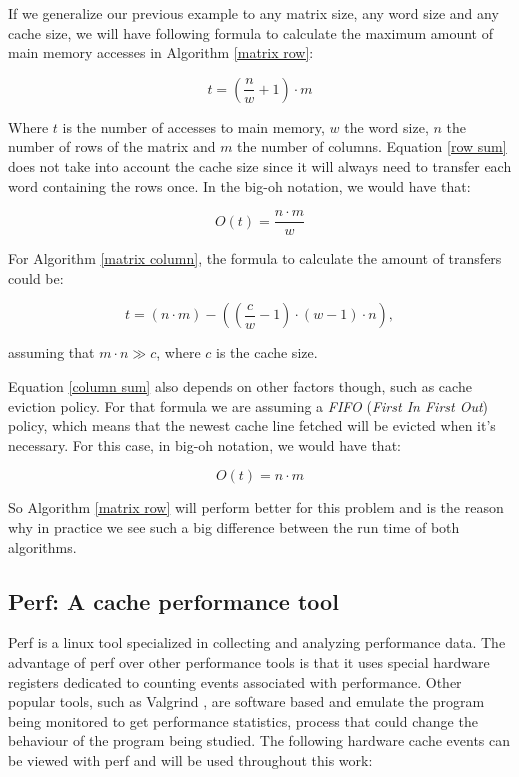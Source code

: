 \documentclass[12pt]{diicc}
\begin{document}
If we generalize our previous example to any matrix size, any word size and any cache size, we will have following formula to calculate the maximum amount of main memory accesses in Algorithm \ref{matrix row}:

\begin{equation}\label{row sum}
t=\left (\frac{n}{w} + 1 \right) \cdot m
\end{equation}

Where $t$ is the number of accesses to main memory, $w$ the word size, $n$ the number of rows of the matrix and $m$ the number of columns. Equation \eqref{row sum} does not take into account the cache size since it will always need to transfer each word containing the rows once. In the big-oh notation, we would have that:

\[ O(t)=\frac{n \cdot m}{w} \]

For Algorithm \ref{matrix column}, the formula to calculate the amount of transfers could be:

\begin{equation}\label{column sum}
t=(n \cdot m) - \left(\left(\frac{c}{w}-1\right)\cdot \left(w-1\right)\cdot n\right),
\end{equation}

assuming that $m\cdot n\gg c$, where $c$ is the cache size.

Equation \eqref{column sum} also depends on other factors though, such as cache eviction policy. For that formula we are assuming a \textit{FIFO} (\textit{First In First Out}) policy, which means that the newest cache line fetched will be evicted when it's necessary. For this case, in big-oh notation, we would have that:

\[ O(t)=n \cdot m \]

So Algorithm \ref{matrix row} will perform better for this problem and is the reason why in practice we see such a big difference between the run time of both algorithms. 

\subsection{Perf: A cache performance tool}

Perf \cite{perf} is a linux tool specialized in collecting and analyzing performance data. The advantage of perf over other performance tools is that it uses special hardware registers dedicated to counting events associated with performance. Other popular tools, such as Valgrind \cite{valgrind}, are software based and emulate the program being monitored to get performance statistics, process that could change the behaviour of the program being studied. The following hardware cache events can be viewed with perf and will be used throughout this work:
\end{document}
